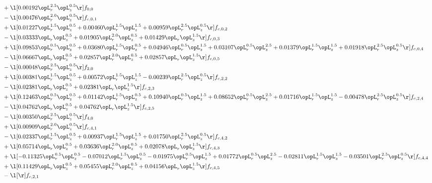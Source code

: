 \begin{alignat}{2}
& + \l[  0.00192 \opL_r^{2.5} \opL_z^{0.5}  \r] f_{0,0} \nonumber \\ 
& - \l[  0.00476 \opL_r^{2.0} \opL_z^{0.5}  \r] f_{c,0,1} \nonumber \\ 
& + \l[  0.01227 \opL_r^{1.5} \opL_z^{0.5} +  0.00460 \opL_r^{1.5} \opL_z^{1.5} +  0.00959 \opL_r^{2.5} \opL_z^{0.5}  \r] f_{c,0,2} \nonumber \\ 
& - \l[  0.03333 \opL_r \opL_z^{0.5} +  0.01905 \opL_r^{2.0} \opL_z^{0.5} +  0.01429 \opL_r \opL_z^{1.5}  \r] f_{c,0,3} \nonumber \\ 
& + \l[  0.09853 \opL_r^{0.5} \opL_z^{0.5} +  0.03680 \opL_r^{1.5} \opL_z^{0.5} +  0.04946 \opL_r^{0.5} \opL_z^{1.5} +  0.03107 \opL_r^{0.5} \opL_z^{2.5} +  0.01379 \opL_r^{1.5} \opL_z^{1.5} +  0.01918 \opL_r^{2.5} \opL_z^{0.5}  \r] f_{c,0,4} \nonumber \\ 
& - \l[  0.06667 \opL_r \opL_z^{0.5} +  0.02857 \opL_r^{2.0} \opL_z^{0.5} +  0.02857 \opL_r \opL_z^{1.5}  \r] f_{c,0,5} \nonumber \\ 
& - \l[  0.00048 \opL_r^{2.5} \opL_z^{0.5}  \r] f_{2,0} \nonumber \\ 
& + \l[  0.00381 \opL_r^{1.5} \opL_z^{0.5} +  0.00572 \opL_r^{1.5} \opL_z^{1.5}   -0.00239 \opL_r^{2.5} \opL_z^{0.5}  \r] f_{c,2,2} \nonumber \\ 
& - \l[  0.02381 \opL_r \opL_z^{0.5} +  0.02381 \opL_r \opL_z^{1.5}  \r] f_{c,2,3} \nonumber \\ 
& + \l[  0.12463 \opL_r^{0.5} \opL_z^{0.5} +  0.01142 \opL_r^{1.5} \opL_z^{0.5} +  0.10940 \opL_r^{0.5} \opL_z^{1.5} +  0.08652 \opL_r^{0.5} \opL_z^{2.5} +  0.01716 \opL_r^{1.5} \opL_z^{1.5}   -0.00478 \opL_r^{2.5} \opL_z^{0.5}  \r] f_{c,2,4} \nonumber \\ 
& - \l[  0.04762 \opL_r \opL_z^{0.5} +  0.04762 \opL_r \opL_z^{1.5}  \r] f_{c,2,5} \nonumber \\ 
& - \l[  0.00350 \opL_r^{2.5} \opL_z^{0.5}  \r] f_{4,0} \nonumber \\ 
& + \l[  0.00909 \opL_r^{2.0} \opL_z^{0.5}  \r] f_{c,4,1} \nonumber \\ 
& - \l[  0.02337 \opL_r^{1.5} \opL_z^{0.5} +  0.00937 \opL_r^{1.5} \opL_z^{1.5} +  0.01750 \opL_r^{2.5} \opL_z^{0.5}  \r] f_{c,4,2} \nonumber \\ 
& + \l[  0.05714 \opL_r \opL_z^{0.5} +  0.03636 \opL_r^{2.0} \opL_z^{0.5} +  0.02078 \opL_r \opL_z^{1.5}  \r] f_{c,4,3} \nonumber \\ 
& + \l[  -0.11325 \opL_r^{0.5} \opL_z^{0.5}   -0.07012 \opL_r^{1.5} \opL_z^{0.5}   -0.01975 \opL_r^{0.5} \opL_z^{1.5} +  0.01772 \opL_r^{0.5} \opL_z^{2.5}   -0.02811 \opL_r^{1.5} \opL_z^{1.5}   -0.03501 \opL_r^{2.5} \opL_z^{0.5}  \r] f_{c,4,4} \nonumber \\ 
& + \l[  0.11429 \opL_r \opL_z^{0.5} +  0.05455 \opL_r^{2.0} \opL_z^{0.5} +  0.04156 \opL_r \opL_z^{1.5}  \r] f_{c,4,5} \nonumber \\ 
& - \l[  \r] f_{c,2,1} \nonumber \\ 
\end{alignat} 


